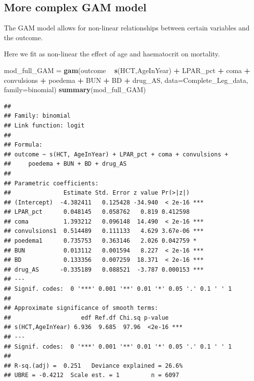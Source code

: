 \documentclass[]{article}
\newenvironment{Shaded}{\begin{snugshade}}{\end{snugshade}}
\newcommand{\KeywordTok}[1]{\textcolor[rgb]{0.13,0.29,0.53}{\textbf{#1}}}
\newcommand{\DataTypeTok}[1]{\textcolor[rgb]{0.13,0.29,0.53}{#1}}
\newcommand{\StringTok}[1]{\textcolor[rgb]{0.31,0.60,0.02}{#1}}
\newcommand{\OperatorTok}[1]{\textcolor[rgb]{0.81,0.36,0.00}{\textbf{#1}}}
\newcommand{\NormalTok}[1]{#1}
\begin{document}
\subsection{More complex GAM model}\label{more-complex-gam-model}

The GAM model allows for non-linear relationships between certain
variables and the outcome.

Here we fit as non-linear the effect of age and haematocrit on
mortality.

\begin{Shaded}
\begin{Highlighting}[]
\NormalTok{mod_full_GAM =}\StringTok{ }\KeywordTok{gam}\NormalTok{(outcome }\OperatorTok{~}\StringTok{ }\KeywordTok{s}\NormalTok{(HCT,AgeInYear) }\OperatorTok{+}\StringTok{ }\NormalTok{LPAR_pct  }\OperatorTok{+}\StringTok{ }\NormalTok{coma }\OperatorTok{+}\StringTok{ }\NormalTok{convulsions }\OperatorTok{+}
\StringTok{                   }\NormalTok{poedema }\OperatorTok{+}\StringTok{ }\NormalTok{BUN }\OperatorTok{+}\StringTok{ }\NormalTok{BD }\OperatorTok{+}\StringTok{ }\NormalTok{drug_AS,}
               \DataTypeTok{data=}\NormalTok{Complete_Leg_data, }\DataTypeTok{family=}\NormalTok{binomial)}
\KeywordTok{summary}\NormalTok{(mod_full_GAM)}
\end{Highlighting}
\end{Shaded}

\begin{verbatim}
## 
## Family: binomial 
## Link function: logit 
## 
## Formula:
## outcome ~ s(HCT, AgeInYear) + LPAR_pct + coma + convulsions + 
##     poedema + BUN + BD + drug_AS
## 
## Parametric coefficients:
##               Estimate Std. Error z value Pr(>|z|)    
## (Intercept)  -4.382411   0.125428 -34.940  < 2e-16 ***
## LPAR_pct      0.048145   0.058762   0.819 0.412598    
## coma          1.393212   0.096148  14.490  < 2e-16 ***
## convulsions1  0.514489   0.111133   4.629 3.67e-06 ***
## poedema1      0.735753   0.363146   2.026 0.042759 *  
## BUN           0.013112   0.001594   8.227  < 2e-16 ***
## BD            0.133356   0.007259  18.371  < 2e-16 ***
## drug_AS      -0.335189   0.088521  -3.787 0.000153 ***
## ---
## Signif. codes:  0 '***' 0.001 '**' 0.01 '*' 0.05 '.' 0.1 ' ' 1
## 
## Approximate significance of smooth terms:
##                    edf Ref.df Chi.sq p-value    
## s(HCT,AgeInYear) 6.936  9.685  97.96  <2e-16 ***
## ---
## Signif. codes:  0 '***' 0.001 '**' 0.01 '*' 0.05 '.' 0.1 ' ' 1
## 
## R-sq.(adj) =  0.251   Deviance explained = 26.6%
## UBRE = -0.4212  Scale est. = 1         n = 6097
\end{verbatim}
\end{document}
